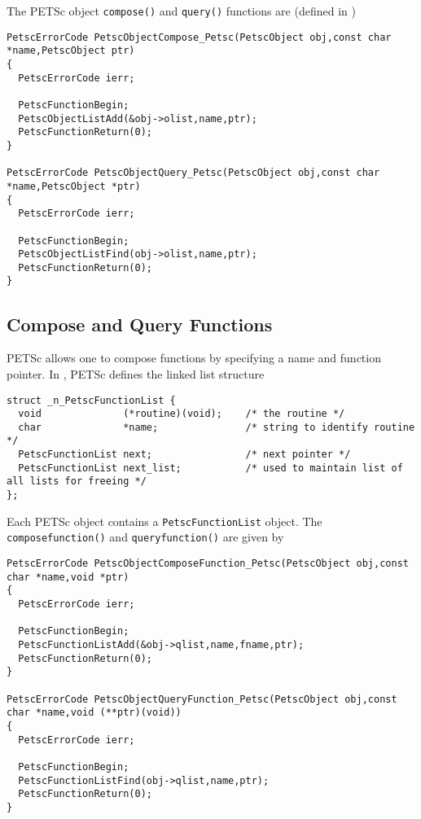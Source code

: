 The PETSc object \lstinline{compose()} and \lstinline{query()} functions are
(defined in \href{http://www.mcs.anl.gov/petsc/petsc-master/src/objects/inherit.c.html}{})
\begin{lstlisting}
PetscErrorCode PetscObjectCompose_Petsc(PetscObject obj,const char *name,PetscObject ptr)
{
  PetscErrorCode ierr;

  PetscFunctionBegin;
  PetscObjectListAdd(&obj->olist,name,ptr);
  PetscFunctionReturn(0);
}

PetscErrorCode PetscObjectQuery_Petsc(PetscObject obj,const char *name,PetscObject *ptr)
{
  PetscErrorCode ierr;

  PetscFunctionBegin;
  PetscObjectListFind(obj->olist,name,ptr);
  PetscFunctionReturn(0); 
}
\end{lstlisting}

\subsection{Compose and Query Functions}

PETSc allows one to compose functions by specifying a name and function pointer. 
In \href{http://www.mcs.anl.gov/petsc/petsc-master/src/sys/dll/reg.c.html}{},
PETSc defines the linked list structure

\begin{lstlisting}
struct _n_PetscFunctionList {
  void              (*routine)(void);    /* the routine */
  char              *name;               /* string to identify routine */
  PetscFunctionList next;                /* next pointer */
  PetscFunctionList next_list;           /* used to maintain list of all lists for freeing */
};
\end{lstlisting}

Each PETSc object contains a \lstinline{PetscFunctionList} object. 
The \lstinline{composefunction()} and \lstinline{queryfunction()} are given by

\begin{lstlisting}
PetscErrorCode PetscObjectComposeFunction_Petsc(PetscObject obj,const char *name,void *ptr)
{
  PetscErrorCode ierr;

  PetscFunctionBegin;
  PetscFunctionListAdd(&obj->qlist,name,fname,ptr);
  PetscFunctionReturn(0);
}

PetscErrorCode PetscObjectQueryFunction_Petsc(PetscObject obj,const char *name,void (**ptr)(void))
{
  PetscErrorCode ierr;

  PetscFunctionBegin;
  PetscFunctionListFind(obj->qlist,name,ptr);
  PetscFunctionReturn(0);
}
\end{lstlisting}

